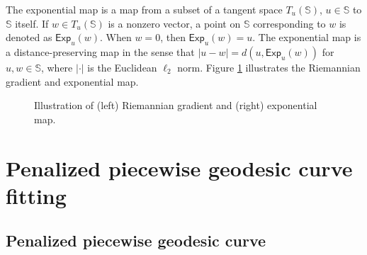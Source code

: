 The exponential map is a map from a subset of a tangent space \(T_u(\mathbb{S})\), \(u \in \mathbb{S}\) to \(\mathbb {S}\) itself.
If \(w \in T_u(\mathbb{S})\) is a nonzero vector, a point on \(\mathbb{S}\) corresponding to \(w\) is denoted as \(\mathsf{Exp}_u(w)\). When \(w = 0\), then \(\mathsf{Exp}_u(w) = u\). The exponential map is a distance-preserving map in the sense that \(\vert{u-w}\vert = d(u, \mathsf{Exp}_u(w))\) for \(u, w \in \mathbb{S}\), where \(\vert{\cdot}\vert\) is the Euclidean \(\ell_2\) norm. Figure \ref{fig:riemann} illustrates the Riemannian gradient and exponential map.

\begin{figure}

{\centering {}

}

\caption{Illustration of (left) Riemannian gradient and (right) exponential map.}\label{fig:riemann}
\end{figure}

\section{Penalized piecewise geodesic curve fitting}\label{ppgc}

\subsection*{Penalized piecewise geodesic curve}\label{penalized-piecewise-geodesic-curve}

